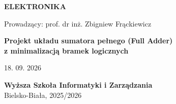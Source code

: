 \documentclass[12pt,a4paper]{article}
\begin{document}
\begin{titlepage}
    \centering
    {\Large \textbf{ELEKTRONIKA}\par}
    \vspace{1em}
    {\large Prowadzący: prof. dr inż. Zbigniew Frąckiewicz\par}
    \vspace{4em}
    {\LARGE \textbf{Projekt układu sumatora pełnego (Full Adder)\\[0.5em] z minimalizacją bramek logicznych}\par}
    \vspace{4em}
    {\large 18. 09. 2026\par}
    \vfill
    {\large \textbf{Wyższa Szkoła Informatyki i Zarządzania}\\[0.3em]
    Bielsko-Biała, 2025/2026\par}
    \vspace{2em}
    \begin{tabular}{|c|}
        \hline
        [IMIĘ NAZWISKO NUMER INDEKSU] \\
        \hline
    \end{tabular}
\end{titlepage}

\tableofcontents
\newpage







\end{document}
